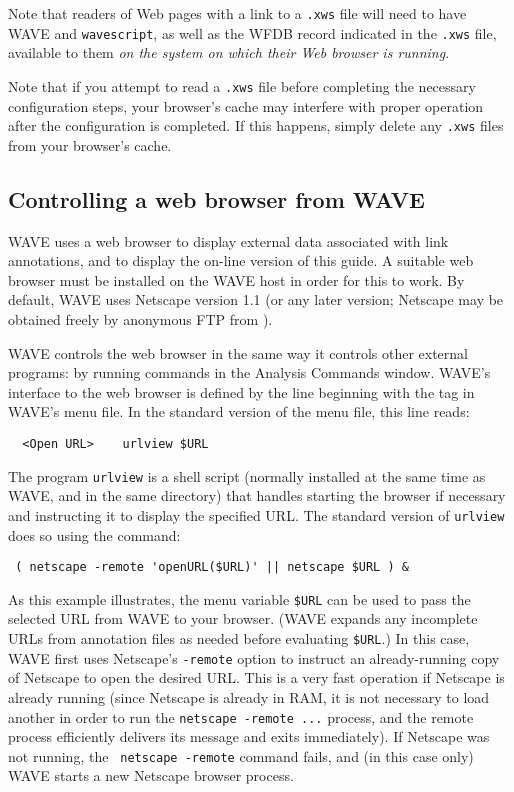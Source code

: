 \documentclass[twoside]{book}
\newcommand{\WAVE}{{\sf WAVE}\xspace}
\begin{document}
Note that readers of Web pages with a link to a {\tt .xws} file will
need to have \WAVE{} and {\tt wavescript}, as well as the WFDB record
indicated in the {\tt .xws} file, available to them \emph{on the
system on which their Web browser is running}.

Note that if you attempt to read a {\tt .xws} file before completing
the necessary configuration steps, your browser's cache may interfere
with proper operation after the configuration is completed.  If this
happens, simply delete any {\tt .xws} files from your browser's cache.

\subsection*{Controlling a web browser from \WAVE{}}

\WAVE{} uses a web browser to display external data associated
with link annotations, and to display the on-line version of this
guide.  A suitable web browser must be installed on the \WAVE{} host
in order for this to work.  By default, \WAVE{} uses Netscape version
1.1 (or any later version;  Netscape may be obtained freely by
anonymous FTP from
).

\WAVE{} controls the web browser in the same way it controls other
external programs:  by running commands in the {\sf Analysis Commands}
window.  \WAVE{}'s interface to the web browser is defined by the
line beginning with the {\tt <Open URL>} tag in \WAVE{}'s menu
file.  In the standard version of the menu file, this line reads:
\begin{verbatim}
  <Open URL>    urlview $URL
\end{verbatim}

The program {\tt urlview} is a shell script (normally installed at the
same time as \WAVE{}, and in the same directory) that handles starting
the browser if necessary and instructing it to display the specified
URL.  The standard version of {\tt urlview} does so using the command:
\begin{verbatim}
 ( netscape -remote 'openURL($URL)' || netscape $URL ) &
\end{verbatim}

As this example illustrates, the menu variable {\tt \$URL} can be used
to pass the selected URL from \WAVE{} to your browser.  (\WAVE{}
expands any incomplete URLs from annotation files as needed before
evaluating {\tt \$URL}.)  In this case, \WAVE{} first uses Netscape's
{\tt -remote} option to instruct an already-running copy of Netscape
to open the desired URL.  This is a very fast operation if Netscape is
already running (since Netscape is already in RAM, it is not necessary
to load another in order to run the {\tt netscape -remote ...}
process, and the remote process efficiently delivers its message and
exits immediately).  If Netscape was not running, the {\tt
netscape -remote} command fails, and (in this case only) \WAVE{}
starts a new Netscape browser process.
\end{document}
